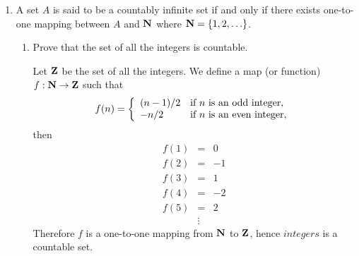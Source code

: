 \begin{enumerate}
\begin{enumerate}
\begin{solution}
		\end{solution}
	\end{enumerate}
	\fi


	\item A set $A$ is said to be a countably infinite set
		if and only if there exists one-to-one mapping between $A$ and ${\mbox{\bf N}}$
		where ${\mbox{\bf N}} = \{1,2,\ldots\}$.
	\begin{enumerate}
		\item Prove that the set of all the integers is countable.
		\ifdefined\sol
		\begin{solution}
			Let ${\mbox{\bf Z}}$ be the set of all the integers.
			We define a map (or function) $f:{\mbox{\bf N}} \to {\mbox{\bf Z}}$
			such that
			\[
				f(n) = \left\{\begin{array}{ll}
					(n-1)/2 &\mbox{if } n \mbox{ is an odd integer,}
					\\-n/2 &\mbox{if } n \mbox{ is an even integer,}
				\end{array}\right.
			\]
			then
			\begin{eqnarray*}
				f(1) &=& 0
				\\f(2) &=& -1
				\\f(3) &=& 1
				\\f(4) &=& -2
				\\f(5) &=& 2
				\\ &\vdots&
			\end{eqnarray*}
			Therefore $f$ is a one-to-one mapping from ${\mbox{\bf N}}$ to ${\mbox{\bf Z}}$,
			hence $integers$ is a countable set.
		\end{solution}
		\fi

		\newlength{\aaa}
		\newlength{\bbb}
		\settowidth{\aaa}{$2/2$}
		\newcommand{\erase}{\rule[.5\bbb]{\aaa}{.1pt} \hspace{-\aaa}}


\end{enumerate}
\end{enumerate}
